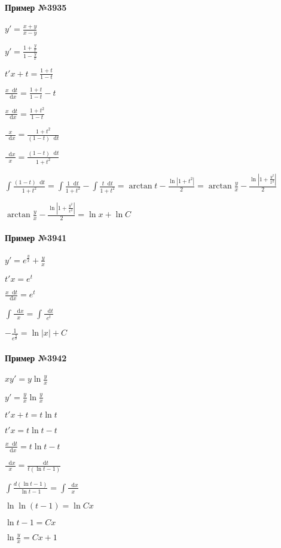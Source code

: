 \documentclass{article}
\newcommand*\diff{\mathop{}\!\mathrm{d}}
\begin{document}
\begin{minipage}{0.49\textwidth}
    \paragraph{Пример №3935}
    $y' = \frac{x + y}{x - y}$

    $y' = \frac{1 + \frac{y}{x}}{1 - \frac{y}{x}}$

    $t' x + t = \frac{1 + t}{1 - t}$

    $\frac{x \diff t}{\diff x} = \frac{1 + t}{1 - t} - t$

    $\frac{x \diff t}{\diff x} = \frac{1 + t^2}{1 - t}$

    $\frac{x}{\diff x} = \frac{1 + t^2}{(1 - t) \diff t}$

    $\frac{\diff x}{x} = \frac{(1 - t) \diff t}{1 + t^2}$

    $\int \frac{(1 - t) \diff t}{1 + t^2} = \int \frac{1 \diff t}{1 + t^2} - \int \frac{t \diff t}{1 + t^2} = \arctan t - \frac{\ln |1 + t^2|}{2} = \arctan \frac{y}{x} - \frac{\ln |1 + \frac{y^2}{x^2}|}{2}$

    $\arctan \frac{y}{x} - \frac{\ln |1 + \frac{y^2}{x^2}|}{2} = \ln x + \ln C$
\end{minipage}
\begin{minipage}{0.49\textwidth}
    \paragraph{Пример №3941}
    $y' = e^{\frac{y}{x}} + \frac{y}{x}$

    $t' x = e^{t}$

    $\frac{x \diff t}{\diff x} = e^{t}$

    $\int \frac{\diff x}{x} = \int \frac{\diff t}{e^{t}}$

    $- \frac{1}{e^{\frac{y}{x}}} = \ln |x| + C$
    \paragraph{Пример №3942}
    $x y' = y \ln \frac{y}{x}$

    $y' = \frac{y}{x} \ln \frac{y}{x}$

    $t' x + t = t \ln t$

    $t' x = t \ln t - t$

    $\frac{x \diff t}{\diff x} = t \ln t - t$

    $\frac{\diff x}{x} = \frac{\diff t}{t(\ln t - 1)}$

    $\int \frac{d (\ln t - 1)}{\ln t - 1} = \int \frac{\diff x}{x}$

    $\ln \ln (t - 1) = \ln C x$

    $\ln t - 1 = Cx$

    $\ln \frac{y}{x} = Cx + 1$
\end{minipage}
\end{document}
